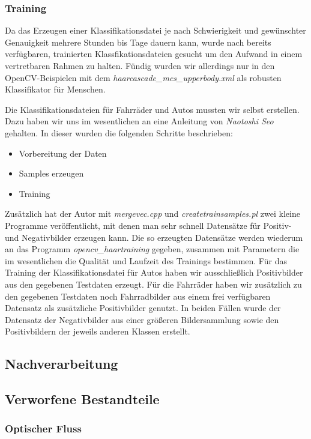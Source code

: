 \documentclass[conference]{IEEEtran}
\begin{document}
\subsubsection{Training}

Da das Erzeugen einer Klassifikationsdatei je nach Schwierigkeit und gewünschter Genauigkeit mehrere Stunden bis Tage dauern kann, wurde nach bereits verfügbaren, trainierten Klassfikationsdateien gesucht um den Aufwand in einem vertretbaren Rahmen zu halten. Fündig wurden wir allerdings nur in den OpenCV-Beispielen mit dem \textit{haarcascade\_mcs\_upperbody.xml} als robusten Klassifikator für Menschen. 

Die Klassifikationsdateien für Fahrräder und Autos mussten wir selbst erstellen.
Dazu haben wir uns im wesentlichen an eine Anleitung\cite{Seo:Haartraining} von \textit{Naotoshi Seo} gehalten. In dieser wurden die folgenden Schritte beschrieben:
\begin{itemize}
	\item Vorbereitung der Daten
	\item Samples erzeugen
	\item Training
\end{itemize}
Zusätzlich hat der Autor mit \textit{mergevec.cpp} und \textit{createtrainsamples.pl} zwei kleine Programme veröffentlicht, mit denen man sehr schnell Datensätze für Positiv- und Negativbilder erzeugen kann. Die so erzeugten Datensätze werden wiederum an das Programm \textit{opencv\_haartraining} gegeben, zusammen mit Parametern die im wesentlichen die Qualität und Laufzeit des Trainings bestimmen.
Für das Training der Klassifikationsdatei für Autos haben wir ausschließlich Positivbilder aus den gegebenen Testdaten erzeugt. Für die Fahrräder haben wir zusätzlich zu den gegebenen Testdaten noch Fahrradbilder aus einem frei verfügbaren Datensatz\cite{Caltech256} als zusätzliche Positivbilder genutzt. In beiden Fällen wurde der Datensatz der Negativbilder aus einer größeren Bildersammlung sowie den Positivbildern der jeweils anderen Klassen erstellt.

\subsection{Nachverarbeitung}

\subsection{Verworfene Bestandteile}

\subsubsection{Optischer Fluss}
\end{document}

